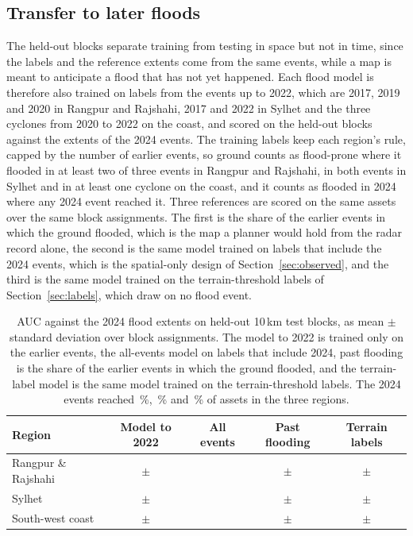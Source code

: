 \subsection{Transfer to later floods}
\label{sec:temporal}

The held-out blocks separate training from testing in space but not in time, since the labels and the reference extents come from the same events, while a map is meant to anticipate a flood that has not yet happened. Each flood model is therefore also trained on labels from the events up to 2022, which are 2017, 2019 and 2020 in Rangpur and Rajshahi, 2017 and 2022 in Sylhet and the three cyclones from 2020 to 2022 on the coast, and scored on the held-out blocks against the extents of the 2024 events. The training labels keep each region's rule, capped by the number of earlier events, so ground counts as flood-prone where it flooded in at least two of three events in Rangpur and Rajshahi, in both events in Sylhet and in at least one cyclone on the coast, and it counts as flooded in 2024 where any 2024 event reached it. Three references are scored on the same assets over the same \RRTempSeeds{} block assignments. The first is the share of the earlier events in which the ground flooded, which is the map a planner would hold from the radar record alone, the second is the same model trained on labels that include the 2024 events, which is the spatial-only design of Section~\ref{sec:observed}, and the third is the same model trained on the terrain-threshold labels of Section~\ref{sec:labels}, which draw on no flood event.

\begin{table}[t]
\centering
\small
\begin{tabular}{lcccc}
\toprule
Region & Model to 2022 & All events & Past flooding & Terrain labels \\
\midrule
Rangpur \& Rajshahi & \RRTempAUC{} $\pm$ \RRTempSD{} & \RRTempAllAUC{} & \RRTempPastAUC{} $\pm$ \RRTempPastSD{} & \RRTempProxyAUC{} $\pm$ \RRTempProxySD{} \\
Sylhet & \SylhetTempAUC{} $\pm$ \SylhetTempSD{} & \SylhetTempAllAUC{} & \SylhetTempPastAUC{} $\pm$ \SylhetTempPastSD{} & \SylhetTempProxyAUC{} $\pm$ \SylhetTempProxySD{} \\
South-west coast & \CoastalTempAUC{} $\pm$ \CoastalTempSD{} & \CoastalTempAllAUC{} & \CoastalTempPastAUC{} $\pm$ \CoastalTempPastSD{} & \CoastalTempProxyAUC{} $\pm$ \CoastalTempProxySD{} \\
\bottomrule
\end{tabular}
\caption{AUC against the 2024 flood extents on held-out 10\,km test blocks, as mean $\pm$ standard deviation over \RRTempSeeds{} block assignments. The model to 2022 is trained only on the earlier events, the all-events model on labels that include 2024, past flooding is the share of the earlier events in which the ground flooded, and the terrain-label model is the same model trained on the terrain-threshold labels. The 2024 events reached \RRTempTestRate{}\,\%, \SylhetTempTestRate{}\,\% and \CoastalTempTestRate{}\,\% of assets in the three regions.}
\label{tab:temporal}
\end{table}

